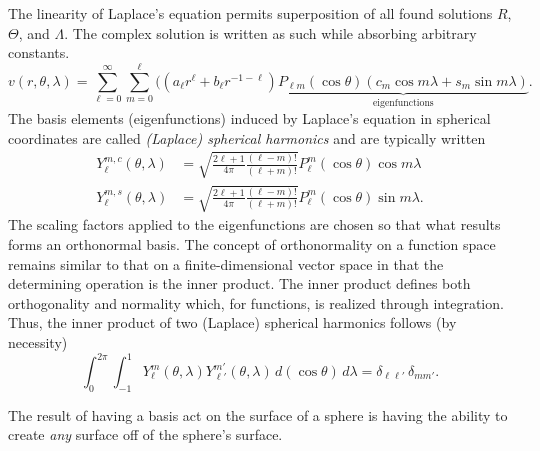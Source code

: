 \documentclass[11pt,dvipsnames]{thesis}
\begin{document}
The linearity of Laplace's equation permits superposition of all found solutions $R$, $\Theta$, and $\Lambda$. The complex solution is written as such while absorbing arbitrary constants.
\begin{equation}
v(r, \theta, \lambda) = \sum_{\ell = 0}^\infty \sum_{m = 0}^\ell ((a_\ell r^\ell + b_\ell r^{-1 - \ell}) \underbrace{P_{\ell m}(\cos\theta) (c_m \cos m\lambda + s_m \sin m\lambda)}_{\text{eigenfunctions}}. \label{eq:SolutionOfLaplacesEquationInSphericalCoords}
\end{equation}
The basis elements (eigenfunctions) induced by Laplace's equation in spherical coordinates are called \textit{(Laplace) spherical harmonics} and are typically written
\begin{align}
Y_\ell^{m,c}(\theta, \lambda) &= \sqrt{\frac{2\ell + 1}{4\pi} \frac{(\ell - m)!}{(\ell + m)!}} P_\ell^m(\cos\theta) \cos m \lambda \\
Y_\ell^{m,s}(\theta, \lambda) &= \sqrt{\frac{2\ell + 1}{4\pi} \frac{(\ell - m)!}{(\ell + m)!}} P_\ell^m(\cos\theta) \sin m \lambda.
\end{align}
The scaling factors applied to the eigenfunctions are chosen so that what results forms an orthonormal basis. The concept of orthonormality on a function space remains similar to that on a finite-dimensional vector space in that the determining operation is the inner product. The inner product defines both orthogonality and normality which, for functions, is realized through integration. Thus, the inner product of two (Laplace) spherical harmonics follows (by necessity)
\begin{equation}
\int_0^{2\pi} \int_{-1}^1 Y_\ell^m(\theta, \lambda) Y_{\ell'}^{m'}(\theta, \lambda) \, d(\cos\theta) \, d\lambda = \delta_{\ell \ell'}\,\delta_{m m'}.
\end{equation}

The result of having a basis act on the surface of a sphere is having the ability to create \textit{any} surface off of the sphere's surface. 
\end{document}
